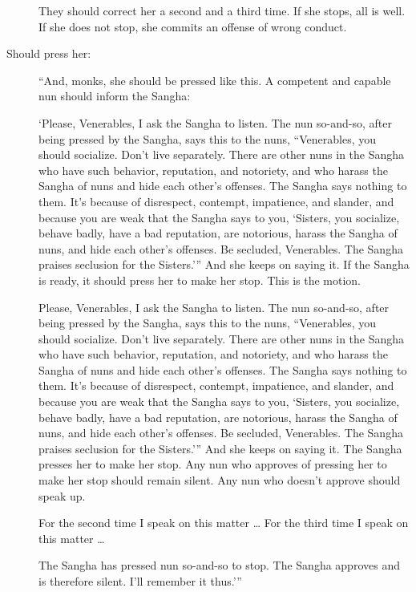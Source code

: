 \documentclass[12pt,openany]{book}%
\begin{document}
\begin{description}
They should correct her a second and a third time. If she stops, all is well. If she does not stop, she commits an offense of wrong conduct. 

%
\item[Should press her: ] “And, monks, she should be pressed like this. A competent and capable nun should inform the Sangha: 

‘Please, Venerables, I ask the Sangha to listen. The nun so-and-so, after being pressed by the Sangha, says this to the nuns, “Venerables, you should socialize. Don’t live separately. There are other nuns in the Sangha who have such behavior, reputation, and notoriety, and who harass the Sangha of nuns and hide each other’s offenses. The Sangha says nothing to them. It’s because of disrespect, contempt, impatience, and slander, and because you are weak that the Sangha says to you, ‘Sisters, you socialize, behave badly, have a bad reputation, are notorious, harass the Sangha of nuns, and hide each other’s offenses. Be secluded, Venerables. The Sangha praises seclusion for the Sisters.’” And she keeps on saying it. If the Sangha is ready, it should press her to make her stop. This is the motion. 

Please, Venerables, I ask the Sangha to listen. The nun so-and-so, after being pressed by the Sangha, says this to the nuns, “Venerables, you should socialize. Don’t live separately. There are other nuns in the Sangha who have such behavior, reputation, and notoriety, and who harass the Sangha of nuns and hide each other’s offenses. The Sangha says nothing to them. It’s because of disrespect, contempt, impatience, and slander, and because you are weak that the Sangha says to you, ‘Sisters, you socialize, behave badly, have a bad reputation, are notorious, harass the Sangha of nuns, and hide each other’s offenses. Be secluded, Venerables. The Sangha praises seclusion for the Sisters.’” And she keeps on saying it. The Sangha presses her to make her stop. Any nun who approves of pressing her to make her stop should remain silent. Any nun who doesn’t approve should speak up. 

For the second time I speak on this matter … For the third time I speak on this matter … 

The Sangha has pressed nun so-and-so to stop. The Sangha approves and is therefore silent. I’ll remember it thus.’” 


\end{description}
\end{document}
